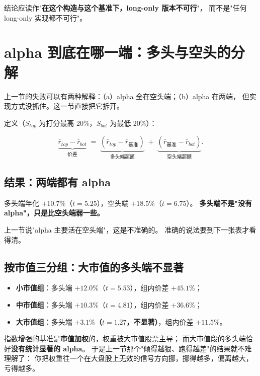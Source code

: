结论应读作"\textbf{在这个构造与这个基准下，long-only 版本不可行}"，
而不是"任何 long-only 实现都不可行"。

\section{alpha 到底在哪一端：多头与空头的分解}

上一节的失败可以有两种解释：（a）alpha 全在空头端；（b）alpha 在两端，
但实现方式没抓住。这一节直接把它拆开。

定义（$S_{top}$ 为打分最高 20\%，$S_{bot}$ 为最低 20\%）：

\begin{equation}
  \underbrace{\bar r_{top} - \bar r_{bot}}_{\text{价差}}
  \;=\;
  \underbrace{(\bar r_{top} - \bar r_{\text{基准}})}_{\text{多头端超额}}
  \;+\;
  \underbrace{(\bar r_{\text{基准}} - \bar r_{bot})}_{\text{空头端超额}} .
\end{equation}

\subsection{结果：两端都有 alpha}



多头端年化 $+10.7\%$（$t=5.25$），空头端 $+18.5\%$（$t=6.75$）。
\textbf{多头端不是"没有 alpha"，只是比空头端弱一些。}

\begin{warnbox}[所以我上一节的解释只对了一半]
上一节说"alpha 主要活在空头端"，这是不准确的。
准确的说法要到下一张表才看得清。
\end{warnbox}

\subsection{按市值三分组：大市值的多头端不显著}



\begin{keybox}[拼图到这里才完整]
\begin{itemize}
  \item \textbf{小市值组}：多头端 $+12.0\%$（$t=5.53$），组内价差 $+45.1\%$；
  \item \textbf{中市值组}：多头端 $+10.3\%$（$t=4.81$），组内价差 $+36.6\%$；
  \item \textbf{大市值组}：多头端 \textbf{$+3.1\%$（$t=1.27$，不显著）}，组内价差 $+11.5\%$。
\end{itemize}

指数增强的基准是\textbf{市值加权}的，权重被大市值股票主导；
而大市值段的多头端恰好\textbf{没有统计显著的 alpha}。
于是上一节那个"倾得越狠、跑得越差"的结果就不难理解了：
你把权重往一个在大盘股上无效的信号方向挪，挪得越多，偏离越大，亏得越多。
\end{keybox}


